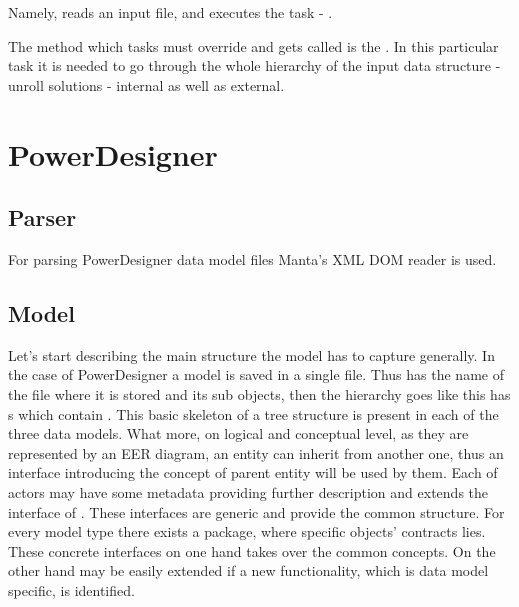  Namely,  reads an input file, and executes the task - . 
 
 The method which tasks must override and gets called is the . In this particular task it is needed to go through the whole hierarchy of the input data structure -  unroll solutions - internal as well as external. 




\section{PowerDesigner}

\subsection{Parser}

For parsing PowerDesigner data model files Manta's XML DOM reader is used.

\subsection{Model}

Let's start describing the main structure the model has to capture generally.
In the case of PowerDesigner a model is saved in a single file. 
Thus  has the name of the file where it is stored and its sub objects, then the hierarchy goes like this  has s which contain .
This basic skeleton of a tree structure is present in each of the three data models. What more, on logical and conceptual level, as they are represented by an EER diagram, an entity can inherit from another one, thus an interface  introducing the concept of parent entity will be used by them. Each of actors may have some metadata providing further description and extends the interface of .
These interfaces are generic and provide the common structure.
For every model type there exists a package, where specific objects' contracts lies. These concrete interfaces on one hand takes over the common concepts. On the other hand may be easily extended if a new functionality, which is data model specific, is identified.

